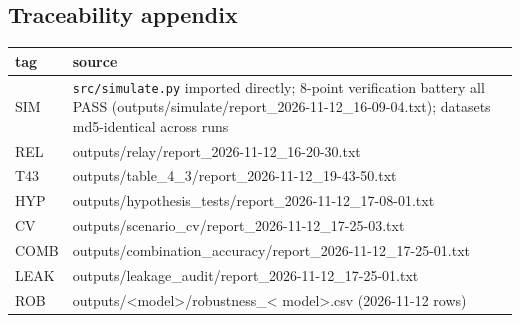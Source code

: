 \documentclass[11pt,a4paper]{article}
\begin{document}
\subsection{Traceability appendix}

\begin{longtable}{@{}p{3.2cm}p{11.4cm}@{}}
\toprule
\textbf{tag} & \textbf{source} \\
\midrule
\endhead
SIM & \texttt{src/simulate.py} imported directly; 8-point
verification battery all PASS (outputs/simulate/report\_2026-11-12\_16-09-04.txt); datasets md5-identical across runs \\
REL & outputs/relay/report\_2026-11-12\_16-20-30.txt \\
T43 & outputs/table\_4\_3/report\_2026-11-12\_19-43-50.txt \\
HYP & outputs/hypothesis\_tests/report\_2026-11-12\_17-08-01.txt \\
CV & outputs/scenario\_cv/report\_2026-11-12\_17-25-03.txt \\
COMB & outputs/combination\_accuracy/report\_2026-11-12\_17-25-01.txt \\
LEAK & outputs/leakage\_audit/report\_2026-11-12\_17-25-01.txt \\
ROB & outputs/\textless model\textgreater/robustness\_\textless
model\textgreater{}.csv (2026-11-12 rows) \\
\bottomrule
\end{longtable}
\end{document}
